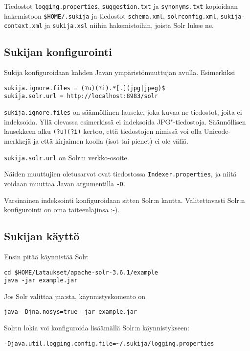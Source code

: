 \documentclass[12pt,a4paper]{scrartcl}
\begin{document}
Tiedostot
\verb=logging.properties=,
\verb=suggestion.txt= ja
\verb=synonyms.txt=
kopioidaan hakemistoon \verb=$HOME/.sukija=
ja tiedostot
\verb=schema.xml=,
\verb=solrconfig.xml=,
\verb=sukija-context.xml= ja
\verb=sukija.xsl=
niihin hakemistoihin, joista Solr lukee ne.



\subsection*{Sukijan konfigurointi}

Sukija konfiguroidaan kahden Javan ympäristömuuttujan avulla. Esimerkiksi

\begin{verbatim}
sukija.ignore.files = (?u)(?i).*[.](jpg|jpeg)$
sukija.solr.url = http://localhost:8983/solr
\end{verbatim}

\verb=sukija.ignore.files= on säännöllinen lauseke, joka kuvaa ne
tiedostot, joita ei indeksoida. Yllä olevassa esimerkissä ei
indeksoida JPG"-tiedostoja. Säännöllisen lausekkeen alku
\verb=(?u)(?i)= kertoo, että tiedostojen nimissä voi olla
Unicode-merkkejä ja että kirjaimen koolla (isot tai pienet) ei ole
väliä.

\verb=sukija.solr.url= on Solr:n verkko-osoite.

Näiden muuttujien oletusarvot ovat tiedostossa
\verb|Indexer.properties|, ja niitä voidaan muuttaa Javan argumentilla
\verb|-D|.

Varsinainen indeksointi konfiguroidaan sitten Solr:n kautta.
Valitettavasti Solr:n konfigurointi on oma taiteenlajinsa :-).


\subsection*{Sukijan käyttö}

Ensin pitää käynnistää Solr:

\begin{verbatim}
cd $HOME/Lataukset/apache-solr-3.6.1/example
java -jar example.jar
\end{verbatim}

Jos Solr valittaa jna:sta, käynnistyskomento on

\verb|java -Djna.nosys=true -jar example.jar|

Solr:n lokia voi konfiguroida lisäämällä Solr:n käynnistykseen:

\verb|-Djava.util.logging.config.file=~/.sukija/logging.properties|
\end{document}
